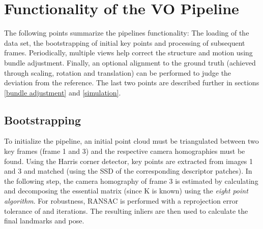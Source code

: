 \chapter{Functionality of the VO Pipeline}
The following points summarize the pipelines functionality: The loading of the data set, the bootstrapping of initial key points and processing of subsequent frames. Periodically, multiple views help correct the structure and motion using bundle adjustment. Finally, an optional alignment to the ground truth (achieved through scaling, rotation and translation) can be performed to judge the deviation from the reference. The last two points are described further in sections \ref{bundle adjustment} and \ref{simulation}.

\section{Bootstrapping}
To initialize the pipeline, an initial point cloud must be triangulated between two key frames (frame 1 and 3) and the respective camera homographies must be found. Using the Harris corner detector, key points are extracted from images 1 and 3 and matched (using the SSD of the corresponding descriptor patches). In the following step, the camera homography of frame 3 is estimated by calculating and decomposing the essential matrix (since K is known) using the \emph{eight point algorithm}. For robustness, RANSAC is performed with a reprojection error tolerance of \ransacPixelTolerance and \ransacNumIterations iterations. The resulting inliers are then used to calculate the final landmarks and pose.      

